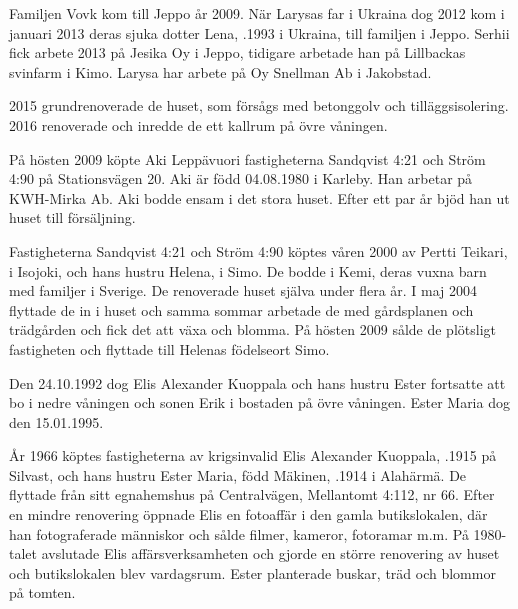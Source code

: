 Familjen Vovk kom  till Jeppo år 2009. När Larysas far i Ukraina dog 	2012 kom i januari 2013 deras sjuka dotter Lena,  .1993 i Ukraina, till familjen i Jeppo. Serhii fick arbete 2013 på Jesika Oy i Jeppo, tidigare arbetade han på 	Lillbackas svinfarm i Kimo. Larysa har arbete på Oy Snellman Ab i	Jakobstad.

2015 grundrenoverade de huset, som försågs med betonggolv och tilläggsisolering. 2016 renoverade och inredde de ett kallrum på övre våningen.


På hösten 2009 köpte Aki Leppävuori fastigheterna Sandqvist 4:21 och Ström 4:90 på Stationsvägen 20. Aki är född 04.08.1980 i Karleby. Han arbetar på KWH-Mirka Ab. Aki bodde ensam i det stora huset. Efter	ett par år bjöd han ut huset till försäljning.


Fastigheterna Sandqvist 4:21 och Ström 4:90 köptes våren 2000 av	Pertti Teikari,  i Isojoki, och hans hustru Helena,  i Simo. De bodde i Kemi, deras vuxna barn med familjer i Sverige. De renoverade huset själva under flera år. I maj 2004 flyttade de in i huset och samma sommar arbetade de med gårdsplanen och	trädgården och fick det att växa och blomma. På hösten 2009 sålde de plötsligt fastigheten och flyttade till Helenas födelseort Simo.


Den 24.10.1992 dog Elis Alexander Kuoppala och hans hustru Ester fortsatte att bo i nedre våningen och sonen Erik i bostaden på övre våningen. Ester Maria dog den 15.01.1995.


År 1966 köptes fastigheterna av krigsinvalid Elis Alexander Kuoppala,	.1915 på Silvast, och hans hustru Ester Maria, född Mäkinen, .1914 i	Alahärmä.  De flyttade från sitt egnahemshus på Centralvägen, Mellantomt 4:112, nr 66. Efter en mindre renovering öppnade Elis en fotoaffär i den gamla butikslokalen, där han fotograferade människor och sålde filmer, kameror, fotoramar m.m. På 1980-talet avslutade Elis affärsverksamheten och gjorde en större renovering av huset och butikslokalen blev vardagsrum. Ester planterade buskar, träd och blommor på tomten.

